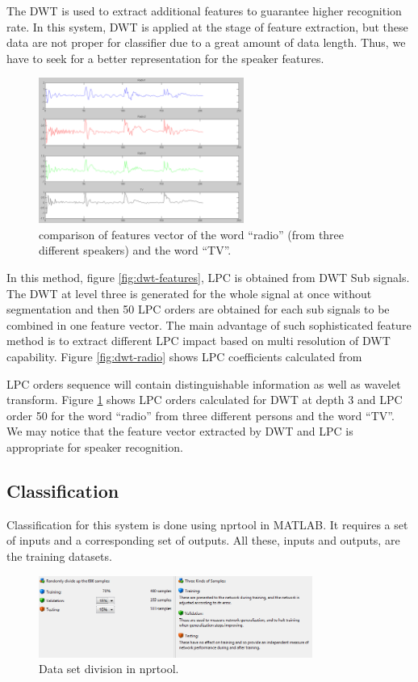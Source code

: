 \documentclass[12pt, a4paper, twoside]{report}
\begin{document}
The DWT is used to extract additional features to guarantee higher recognition rate. In this system, DWT is applied at the stage of feature extraction, but these data are not proper for classifier due to a great amount of data length. Thus, we have to seek for a better representation for the speaker features.
\begin{figure}[!h]
	\centering
	\includegraphics[width=0.6\textwidth]
	{images/chapter5/dwt-lpc-orders}
	\caption{comparison of features vector of the word ``radio'' (from three different speakers) and the word ``TV''.}
	\label{fig:dwt-lpc-orders}
\end{figure}

In this method, figure \ref{fig:dwt-features}, LPC is obtained from DWT Sub signals. The DWT at level three is generated for the whole signal at once without segmentation and then 50 LPC orders are obtained for each sub signals to be combined in one feature vector. The main advantage of such sophisticated feature method is to extract different LPC impact based on multi resolution of DWT capability. Figure \ref{fig:dwt-radio} shows LPC coefficients calculated from 
\par
LPC orders sequence will contain distinguishable information as well as wavelet transform. Figure \ref{fig:dwt-lpc-orders} shows LPC orders calculated for DWT at depth 3 and LPC order 50 for the word ``radio'' from three different persons and the word ``TV''. We may notice that the feature vector extracted by DWT and LPC is appropriate for speaker recognition.
\subsection{Classification}
Classification for this system is done using nprtool in MATLAB. It requires a set of inputs and a corresponding set of outputs. All these, inputs and outputs, are the training datasets.
\begin{figure}[!ht]
	\centering
	\includegraphics[width=0.8\textwidth]
	{images/chapter5/dtw-nprtool}
	\caption{Data set division in nprtool.}
	\label{fig:dtw-nprtool}
\end{figure}
\end{document}
